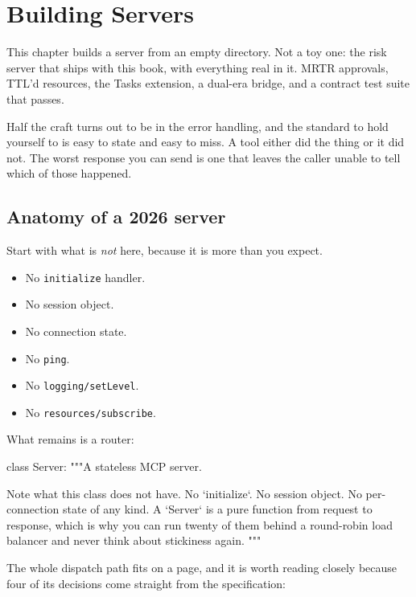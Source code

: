 \chapter{Building Servers}
\label{ch:building-servers}

This chapter builds a server from an empty directory. Not a toy one: the risk
server that ships with this book, with everything real in it. MRTR approvals,
TTL'd resources, the Tasks extension, a dual-era bridge, and a contract test
suite that passes.

Half the craft turns out to be in the error handling, and the standard to hold
yourself to is easy to state and easy to miss. A tool either did the thing or it
did not. The worst response you can send is one that leaves the caller unable to
tell which of those happened.

\section{Anatomy of a 2026 server}

Start with what is \emph{not} here, because it is more than you expect.

\begin{itemize}[leftmargin=1.6em, itemsep=2pt]
\item No \texttt{initialize} handler.
\item No session object.
\item No connection state.
\item No \texttt{ping}.
\item No \texttt{logging/setLevel}.
\item No \texttt{resources/subscribe}.
\end{itemize}

What remains is a router:

\begin{py}
class Server:
    """A stateless MCP server.

    Note what this class does not have. No `initialize`. No session object.
    No per-connection state of any kind. A `Server` is a pure function from
    request to response, which is why you can run twenty of them behind a
    round-robin load balancer and never think about stickiness again.
    """
\end{py}

The whole dispatch path fits on a page, and it is worth reading closely because
four of its decisions come straight from the specification:

